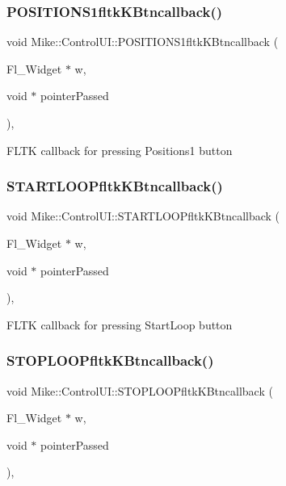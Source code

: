 \subsubsection{\texorpdfstring{P\+O\+S\+I\+T\+I\+O\+N\+S1fltk\+K\+Btncallback()}{POSITIONS1fltkKBtncallback()}}
{\footnotesize\ttfamily void Mike\+::\+Control\+U\+I\+::\+P\+O\+S\+I\+T\+I\+O\+N\+S1fltk\+K\+Btncallback (\begin{DoxyParamCaption}\item[{Fl\+\_\+\+Widget $\ast$}]{w,  }\item[{void $\ast$}]{pointer\+Passed }\end{DoxyParamCaption})\hspace{0.3cm}{\ttfamily [static]}, {\ttfamily [private]}}

F\+L\+TK callback for pressing Positions1 button \mbox{\label{class_mike_1_1_control_u_i_aaf2f6fc2cf93202867a797cf7bb6cc3e}} 
\subsubsection{\texorpdfstring{S\+T\+A\+R\+T\+L\+O\+O\+Pfltk\+K\+Btncallback()}{STARTLOOPfltkKBtncallback()}}
{\footnotesize\ttfamily void Mike\+::\+Control\+U\+I\+::\+S\+T\+A\+R\+T\+L\+O\+O\+Pfltk\+K\+Btncallback (\begin{DoxyParamCaption}\item[{Fl\+\_\+\+Widget $\ast$}]{w,  }\item[{void $\ast$}]{pointer\+Passed }\end{DoxyParamCaption})\hspace{0.3cm}{\ttfamily [static]}, {\ttfamily [private]}}

F\+L\+TK callback for pressing Start\+Loop button \mbox{\label{class_mike_1_1_control_u_i_af3a7231a14cd112112e3e1c71e10baa1}} 
\subsubsection{\texorpdfstring{S\+T\+O\+P\+L\+O\+O\+Pfltk\+K\+Btncallback()}{STOPLOOPfltkKBtncallback()}}
{\footnotesize\ttfamily void Mike\+::\+Control\+U\+I\+::\+S\+T\+O\+P\+L\+O\+O\+Pfltk\+K\+Btncallback (\begin{DoxyParamCaption}\item[{Fl\+\_\+\+Widget $\ast$}]{w,  }\item[{void $\ast$}]{pointer\+Passed }\end{DoxyParamCaption})\hspace{0.3cm}{\ttfamily [static]}, {\ttfamily [private]}}

